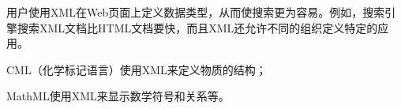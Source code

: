 用户使用XML在Web页面上定义数据类型，从而使搜索更为容易。例如，搜索引擎搜索XML文档比HTML文档要快，而且XML还允许不同的组织定义特定的应用。

\begin{compactitem}
\item CML（化学标记语言）使用XML来定义物质的结构；
\item MathML使用XML来显示数学符号和关系等。
\end{compactitem}









































